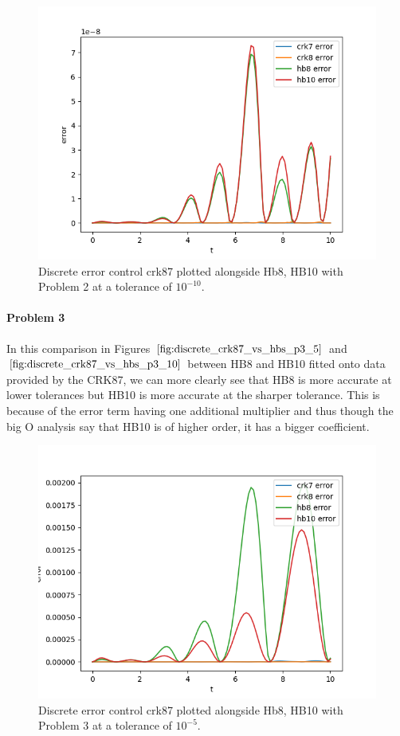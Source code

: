 \begin{figure}[H]
\centering
\includegraphics[width=0.7\linewidth]{./figures/discrete_crk87_vs_hbs_p2_10}
\caption{Discrete error control crk87 plotted alongside Hb8, HB10 with Problem 2 at a tolerance of $10^{-10}$.}
\label{fig:discrete_crk87_vs_hbs_p2_10}
\end{figure}

\paragraph{Problem 3} In this comparison in Figures $\ref{fig:discrete_crk87_vs_hbs_p3_5}$ and $\ref{fig:discrete_crk87_vs_hbs_p3_10}$ between HB8 and HB10 fitted onto data provided by the CRK87, we can more clearly see that HB8 is more accurate at lower tolerances but HB10 is more accurate at the sharper tolerance. This is because of the error term having one additional multiplier and thus though the big O analysis say that HB10 is of higher order, it has a bigger coefficient.

\begin{figure}[H]
\centering
\includegraphics[width=0.7\linewidth]{./figures/discrete_crk87_vs_hbs_p3_5}
\caption{Discrete error control crk87 plotted alongside Hb8, HB10 with Problem 3 at a tolerance of $10^{-5}$.}
\label{fig:discrete_crk87_vs_hbs_p3_5}
\end{figure}

